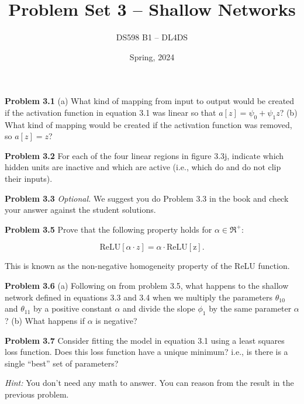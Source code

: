 \documentclass[11pt, oneside]{article}   	%
\title{Problem Set 3 -- Shallow Networks}
\author{DS598 B1 -- DL4DS}
\date{Spring, 2024}							%
\begin{document}
\maketitle

\textbf{Problem 3.1} 
(a) What kind of mapping from input to output would be created if the activation
function in equation 3.1 was linear so that \(a[z] = \psi_0 + \psi_1 z\)? 
(b) What kind of mapping would be created if the activation function was removed,
so \(a[z] = z\)?

\vspace{1cm}

\textbf{Problem 3.2} For each of the four linear regions in figure 3.3j, 
indicate which hidden units are inactive and which are active (i.e., which do
and do not clip their inputs).

\vspace{1cm}

\textbf{Problem 3.3} \textit{Optional.} We suggest you do Problem 3.3 in the book
and check your answer against the student solutions.

\vspace{1cm}

\textbf{Problem 3.5} Prove that the following property holds for
\(\alpha \in \Re^+\):

\[\mathrm{ReLU}[\alpha \cdot z] = \alpha \cdot \mathrm{ReLU[z]}.\]

This is known as the non-negative homogeneity property of the ReLU function.

\vspace{1cm}

\textbf{Problem 3.6} (a) Following on from problem 3.5, what happens to the
shallow network defined in equations 3.3 and 3.4 when we multiply the
parameters \(\theta_{10}\) and \(\theta_{11}\) by a positive constant
\(\alpha\) and divide the slope \(\phi_1\) by the same parameter
\(\alpha\)? (b) What happens if \(\alpha\) is negative?

\vspace{1cm}

\textbf{Problem 3.7} Consider fitting the model in equation 3.1 using a
least squares loss function. Does this loss function have a unique minimum?
i.e., is there is a single “best” set of parameters?

\textit{Hint:} You don't need any math to answer. You can reason from the 
result in the previous problem.

\vspace{1cm}
\end{document}
